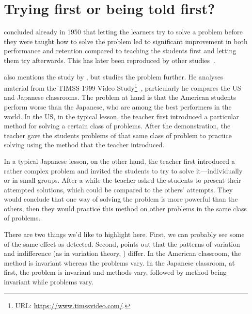 \section{Trying first or being told first?}

\Textcite{Szekely1950} concluded already in 1950 that letting the learners try 
to solve a problem before they were taught how to solve the problem led to 
significant improvement in both performance and retention compared to teaching 
the students first and letting them try afterwards.
This has later been reproduced by other 
studies~\parencites{NecessaryConditionsOfLearning}[see for 
instance][]{BransfordSchwartz1999}.

\Textcite{NecessaryConditionsOfLearning} also mentions the study by 
\citeauthor{Szekely1950}, but studies the problem further.
He analyses material from the TIMSS 1999 Video Study\footnote{%
  URL: \url{https://www.timssvideo.com/}.
}~\parencite[see \eg][]{ClosingTeachingGap}, particularly he compares the US 
and Japanese classrooms.
The problem at hand is that the American students perform worse than the 
Japanese, who are among the best performers in the world.
In the US, in the typical lesson, the teacher first introduced a particular 
method for solving a certain class of problems.
After the demonstration, the teacher gave the students problems of that same 
class of problem to practice solving using the method that the teacher 
introduced.

In a typical Japanese lesson, on the other hand, the teacher first introduced a 
rather complex problem and invited the students to try to solve 
it---individually or in small groups.
After a while the teacher asked the students to present their attempted 
solutions, which could be compared to the others' attempts.
They would conclude that one way of solving the problem is more powerful than 
the others, then they would practice this method on other problems in the same 
class of problems.

There are two things we'd like to highlight here.
First, we can probably see some of the same effect as \textcite{Szekely1950} 
detected.
Second, \textcite{NecessaryConditionsOfLearning} points out that the patterns 
of variation and indifference (as in variation theory, \cite[see 
\eg][Ch.~2]{NecessaryConditionsOfLearning}) differ.
In the American classroom, the method is invariant whereas the problems vary.
In the Japanese classroom, at first, the problem is invariant and methods vary, 
followed by method being invariant while problems vary.

